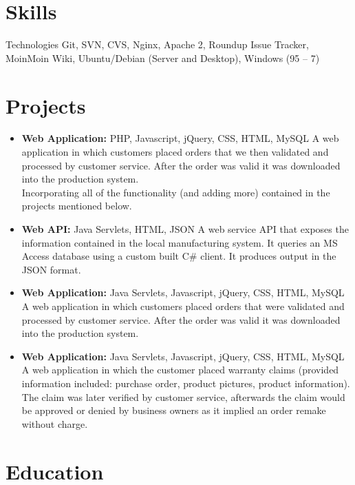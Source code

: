 \documentclass[7pt,a4paper]{moderncv}
\newenvironment{tightitemize}
   {\begin{itemize}
   \setlength{\parskip}{2pt}}
   {\end{itemize}}
\begin{document}
\vspace*{-5mm}
\section{Skills}
{Technologies }{Git, SVN, CVS, Nginx, Apache 2, Roundup Issue Tracker, MoinMoin Wiki, Ubuntu/Debian (Server and Desktop), Windows (95 -- 7)
}
\section{Projects}
\vspace*{-11mm}
\begin{tightitemize}
\item \textbf{Web Application: }{PHP, Javascript, jQuery, CSS, HTML, MySQL}
	A web application in which customers placed orders that we then validated and processed by
	customer service. After the order was valid it was downloaded into the production system.\\	
	Incorporating all of the functionality (and adding more) contained in the projects mentioned below.

\item\textbf{Web API: }{Java Servlets, HTML, JSON}
	A web service API that exposes the information contained in the local manufacturing system.
	It queries an MS Access database using a custom built C\# client. It produces output
	in the JSON format.

\item \textbf{Web Application: }{Java Servlets, Javascript, jQuery, CSS, HTML, MySQL}
	A web application in which customers placed orders that were validated and processed by
	customer service. After the order was valid it was downloaded into the production system.

\item \textbf{Web Application: }{Java Servlets, Javascript, jQuery, CSS, HTML, MySQL}
	A web application in which the customer placed warranty claims (provided information
	included: purchase order, product pictures, product information). The claim was later
	verified by customer service, afterwards the claim would be approved or denied by business owners
	as it implied an order remake without charge.
\end{tightitemize}
\vspace*{-6mm}
\section{Education}
\end{document}
